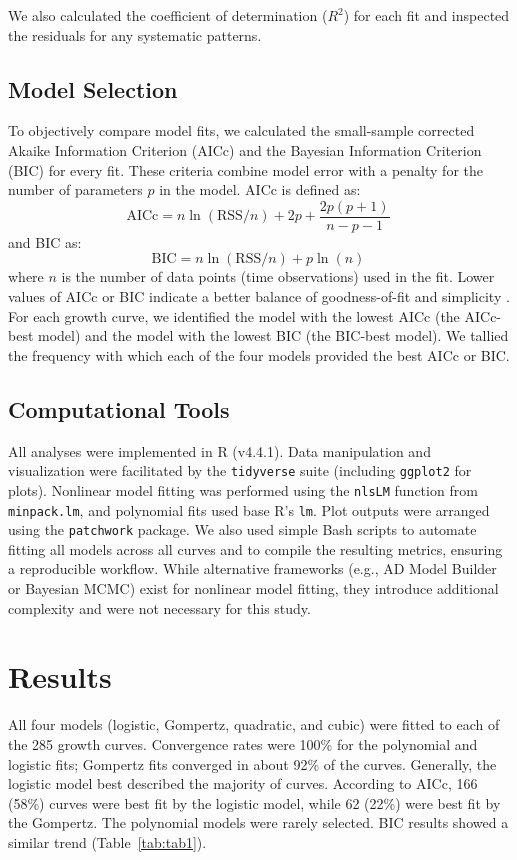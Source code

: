 \documentclass[11pt]{article}
\begin{document}
We also calculated the coefficient of determination ($R^2$) for each fit and inspected the residuals for any systematic patterns.

\subsection{Model Selection}
To objectively compare model fits, we calculated the small-sample corrected Akaike Information Criterion (AICc) and the Bayesian Information Criterion (BIC) for every fit. These criteria combine model error with a penalty for the number of parameters $p$ in the model. AICc is defined as:
\[
\text{AICc} = n \ln(\text{RSS}/n) + 2p + \frac{2p(p+1)}{n-p-1}~
\]
and BIC as:
\[
\text{BIC} = n \ln(\text{RSS}/n) + p\ln(n)~
\]
where $n$ is the number of data points (time observations) used in the fit. Lower values of AICc or BIC indicate a better balance of goodness-of-fit and simplicity \citep{BurnhamAnderson2004}. For each growth curve, we identified the model with the lowest AICc (the AICc-best model) and the model with the lowest BIC (the BIC-best model). We tallied the frequency with which each of the four models provided the best AICc or BIC.

\subsection{Computational Tools}
All analyses were implemented in R (v4.4.1). Data manipulation and visualization were facilitated by the \texttt{tidyverse} suite (including \texttt{ggplot2} for plots). Nonlinear model fitting was performed using the \texttt{nlsLM} function from \texttt{minpack.lm}, and polynomial fits used base R's \texttt{lm}. Plot outputs were arranged using the \texttt{patchwork} package. We also used simple Bash scripts to automate fitting all models across all curves and to compile the resulting metrics, ensuring a reproducible workflow. While alternative frameworks (e.g., AD Model Builder or Bayesian MCMC) exist for nonlinear model fitting, they introduce additional complexity and were not necessary for this study.

\section{Results}
All four models (logistic, Gompertz, quadratic, and cubic) were fitted to each of the 285 growth curves. Convergence rates were 100\% for the polynomial and logistic fits; Gompertz fits converged in about 92\% of the curves. Generally, the logistic model best described the majority of curves. According to AICc, 166 (58\%) curves were best fit by the logistic model, while 62 (22\%) were best fit by the Gompertz. The polynomial models were rarely selected. BIC results showed a similar trend (Table~\ref{tab:tab1}).
\end{document}
